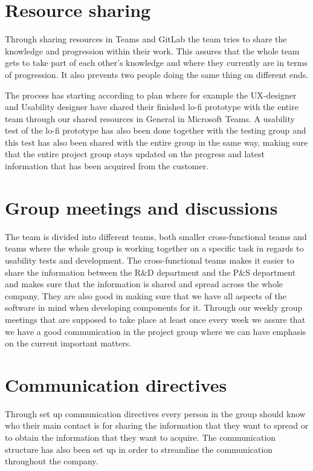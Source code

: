 \documentclass[12pt]{article}
\begin{document}
    \section{Resource sharing}
 Through sharing resources in Teams and GitLab the team tries to share the knowledge and progression within their work. This assures that the whole team gets to take part of each other’s knowledge and where they currently are in terms of progression. It also prevents two people doing the same thing on different ends. 
 
 The process has starting according to plan where for example the UX-designer and Usability designer have shared their finished lo-fi prototype with the entire team through our shared resources in General in Microsoft Teams. A usability test of the lo-fi prototype has also been done together with the testing group and this test has also been shared with the entire group in the same way, making sure that the entire project group stays updated on the progress and latest information that has been acquired from the customer. 
 
    \section{Group meetings and discussions}
The team is divided into different teams, both smaller cross-functional teams and teams where the whole group is working together on a specific task in regards to usability tests and development. The cross-functional teams makes it easier to share the information between the R\&D department and the P\&S department and makes sure that the information is shared and spread across the whole company. They are also good in making sure that we have all aspects of the software in mind when developing components for it. Through our weekly group meetings that are supposed to take place at least once every week we assure that we have a good communication in the project group where we can have emphasis on the current important matters.

    \section{Communication directives}
Through set up communication directives every person in the group should know who their main contact is for sharing the information that they want to spread or to obtain the information that they want to acquire. The communication structure has also been set up in order to streamline the communication throughout the company. 
\end{document}
